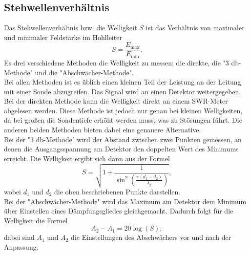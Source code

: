 \subsection{Stehwellenverhältnis}
\label{sec:steh}

Das Stehwellenverhältnis bzw. die Welligkeit $S$ ist das Verhältnis von maximaler und minimaler Feldstärke im Hohlleiter
\begin{equation}
  S = \frac{E_\text{max}}{E_\text{min}}.
\end{equation}
Es drei verschiedene Methoden die Welligkeit zu messen; die direkte, die "3 db-Methode" und die "Abschwächer-Methode".\\
Bei allen Methoden ist es üblich einen kleinen Teil der Leistung an der Leitung mit einer Sonde abzugreifen.
Das Signal wird an einen Detektor weitergegeben.
Bei der direkten Methode kann die Welligkeit direkt an einem SWR-Meter abgelesen werden.
Diese Methode ist jedoch nur genau bei kleinen Welligkeiten, da bei großen die Sondentiefe erhöht werden muss, was zu Störungen führt.
Die anderen beiden Methoden bieten dabei eine genauere Alternative.\\
Bei der "3 db-Methode" wird der Abstand zwischen zwei Punkten gemessen, an denen die Ausgangsspannung am Detektor den doppelten Wert des Minimums erreicht.
Die Welligkeit ergibt sich dann aus der Formel
\begin{equation}
  S = \sqrt{1+\frac{1}{\sin^2\left(\frac{\pi (d_1-d_2)}{\lambda_\text{g}}\right)}}, \label{eqn:3}
\end{equation}
wobei $d_1$ und $d_2$ die oben beschriebenen Punkte darstellen.\\
Bei der "Abschwächer-Methode" wird das Maximum am Detektor dem Minimum über Einstellen eines Dämpfungsgliedes gleichgemacht.
Dadurch folgt für die Welligkeit die Formel
\begin{equation}
  A_2-A_1 = 20\log(S), \label{eqn:4}
\end{equation}
dabei sind $A_1$ und $A_2$ die Einstellungen des Abschwächers vor und nach der Anpassung.

